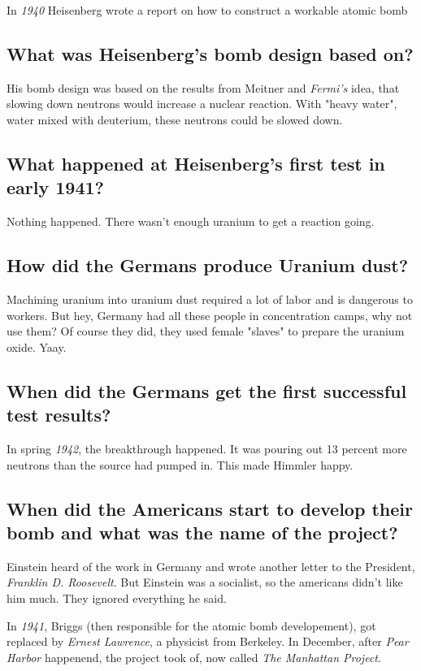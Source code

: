 In \emph{1940} Heisenberg wrote a report on how to construct a workable atomic bomb

\subsection*{What was Heisenberg’s bomb design based on?}
His bomb design was based on the results from Meitner and \emph{Fermi's} idea, that slowing down neutrons would increase a nuclear reaction. With "heavy water", water mixed with deuterium, these neutrons could be slowed down.

\subsection*{What happened at Heisenberg’s first test in early 1941?}
Nothing happened. There wasn't enough uranium to get a reaction going.

\subsection*{How did the Germans produce Uranium dust?}
Machining uranium into uranium dust required a lot of labor and is dangerous to workers. But hey, Germany had all these people in concentration camps, why not use them? Of course they did, they used female "slaves" to prepare the uranium oxide. Yaay.

\subsection*{When did the Germans get the first successful test results?}
In spring \emph{1942}, the breakthrough happened. It was pouring out 13 percent more neutrons than the source had pumped in. This made Himmler happy.

\subsection*{When did the Americans start to develop their bomb and what was the name of the
project?}
Einstein heard of the work in Germany and wrote another letter to the President, \emph{Franklin D. Roosevelt}. But Einstein was a socialist, so the americans didn't like him much. They ignored everything he said.

In \emph{1941}, Briggs (then responsible for the atomic bomb developement), got replaced by \emph{Ernest Lawrence}, a physicist from Berkeley. In December, after \emph{Pear Harbor} happenend, the project took of, now called \emph{The Manhattan Project}.

